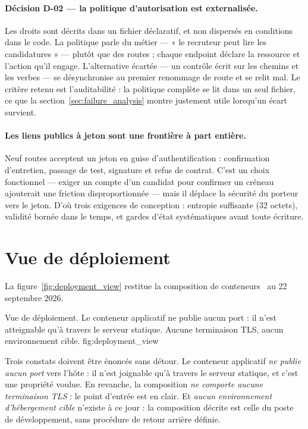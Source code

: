 \paragraph{Décision D-02 — la politique d'autorisation est externalisée.}
Les droits sont décrits dans un fichier déclaratif, et non dispersés en
conditions dans le code. La politique parle du métier — « le recruteur peut
lire les candidatures » — plutôt que des routes ; chaque endpoint déclare la
ressource et l'action qu'il engage. L'alternative écartée — un contrôle écrit
sur les chemins et les verbes — se désynchronise au premier renommage de route
et se relit mal. Le critère retenu est l'auditabilité : la politique complète
se lit dans un seul fichier, ce que la section~\ref{sec:failure_analysis}
montre justement utile lorsqu'un écart survient.

\paragraph{Les liens publics à jeton sont une frontière à part entière.}
Neuf routes acceptent un jeton en guise d'authentification : confirmation
d'entretien, passage de test, signature et refus de contrat. C'est un choix
fonctionnel — exiger un compte d'un candidat pour confirmer un créneau
ajouterait une friction disproportionnée — mais il déplace la sécurité du
porteur vers le jeton. D'où trois exigences de conception : entropie suffisante
(32 octets), validité bornée dans le temps, et gardes d'état systématiques
avant toute écriture.

\section{Vue de déploiement}
\label{sec:deployment_view}

La figure~\ref{fig:deployment_view} restitue la composition de
conteneurs~\cite{docker} au 22 septembre 2026.

  {Vue de déploiement. Le conteneur applicatif ne publie aucun port : il n'est
   atteignable qu'à travers le serveur statique. Aucune terminaison TLS, aucun
   environnement cible.}
  {fig:deployment_view}

Trois constats doivent être énoncés sans détour. Le conteneur applicatif
\emph{ne publie aucun port} vers l'hôte : il n'est joignable qu'à travers le
serveur statique, et c'est une propriété voulue. En revanche, la composition
\emph{ne comporte aucune terminaison TLS} : le point d'entrée est en clair. Et
\emph{aucun environnement d'hébergement cible} n'existe à ce jour : la
composition décrite est celle du poste de développement, sans procédure de
retour arrière définie.

